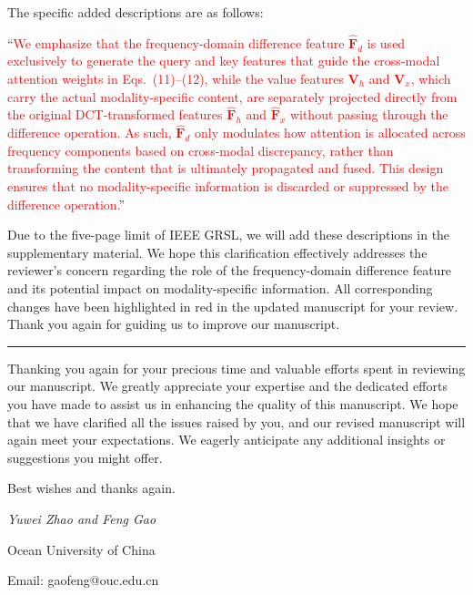 The specific added descriptions are as follows:

``\textcolor{red}{We emphasize that the frequency-domain difference feature $\hat{\mathbf{F}}_d$ is used exclusively to generate the query and key features that guide the cross-modal attention weights in Eqs.~(11)--(12), while the value features $\mathbf{V}_h$ and $\mathbf{V}_x$, which carry the actual modality-specific content, are separately projected directly from the original DCT-transformed features $\hat{\mathbf{F}}_h$ and $\hat{\mathbf{F}}_x$ without passing through the difference operation. As such, $\hat{\mathbf{F}}_d$ only modulates how attention is allocated across frequency components based on cross-modal discrepancy, rather than transforming the content that is ultimately propagated and fused. This design ensures that no modality-specific information is discarded or suppressed by the difference operation.}''

Due to the five-page limit of IEEE GRSL, we will add these descriptions in the supplementary material. We hope this clarification effectively addresses the reviewer's concern regarding the role of the frequency-domain difference feature and its potential impact on modality-specific information. All corresponding changes have been highlighted in red in the updated manuscript for your review. Thank you again for guiding us to improve our manuscript.


\vspace{2em}

\begin{center}
  \rule[-10pt]{14.3cm}{0.05em}
\end{center}

Thanking you again for your precious time and valuable efforts spent in reviewing our manuscript. We greatly appreciate your expertise and the dedicated efforts you have made to assist us in enhancing the quality of this manuscript. We hope that we have clarified all the issues raised by you, and our revised manuscript will again meet your expectations. We eagerly anticipate any additional insights or suggestions you might offer.

Best wishes and thanks again.

\textit{Yuwei Zhao and Feng Gao}

Ocean University of China

Email: gaofeng@ouc.edu.cn
